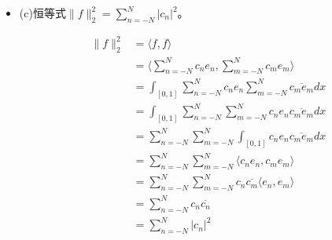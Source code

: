 \documentclass{article}
\begin{document}
\begin{itemize}
  \item (c)恒等式$\|f\|_2^2 = \sum\limits_{n = -N}^N |c_n|^2$。

        \begin{align*}
          \|f\|_2^2
           & = \langle f, f \rangle                                                                        \\
           & = \langle \sum\limits_{n = -N}^N c_n e_n, \sum\limits_{m = -N}^N c_m e_m \rangle              \\
           & = \int_{[0, 1]} \sum\limits_{n = -N}^N c_n e_n \sum\limits_{m = -N}^N \overline{c_m e_m} dx   \\
           & = \int_{[0, 1]} \sum\limits_{n = -N}^N \sum\limits_{m = -N}^N c_n e_n \overline{c_m e_m} dx   \\
           & = \sum\limits_{n = -N}^N \sum\limits_{m = -N}^N \int_{[0, 1]} c_n e_n \overline{c_m e_m} dx   \\
           & = \sum\limits_{n = -N}^N \sum\limits_{m = -N}^N \langle  c_n e_n,  c_m e_m \rangle            \\
           & = \sum\limits_{n = -N}^N \sum\limits_{m = -N}^N c_n \overline{c_m} \langle  e_n,  e_m \rangle \\
           & = \sum\limits_{n = -N}^N c_n \overline{c_n}                                                   \\
           & = \sum\limits_{n = -N}^N |c_n|^2
        \end{align*}
\end{itemize}
\end{document}
